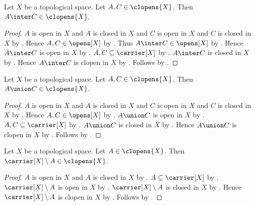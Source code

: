 \begin{proposition}\label{clopens_inter}
    Let $X$ be a topological space.
    Let $A,C\in\clopens{X}$.
    Then $A\inter C\in\clopens{X}$.
\end{proposition}
\begin{proof}
    $A$ is open in $X$ and $A$ is closed in $X$ and
        $C$ is open in $X$ and $C$ is closed in $X$ by
        .
    Hence $A,C\in\opens[X]$ by .
    Thus $A\inter C\in\opens[X]$ by .
    Hence $A\inter C$ is open in $X$ by .
    $A,C\subseteq\carrier[X]$ by
        .
    $A\inter C$ is closed in $X$ by
        .
    Hence $A\inter C$ is clopen in $X$ by .
    Follows by .
\end{proof}

\begin{proposition}\label{clopens_union}
    Let $X$ be a topological space.
    Let $A,C\in\clopens{X}$.
    Then $A\union C\in\clopens{X}$.
\end{proposition}
\begin{proof}
    $A$ is open in $X$ and $A$ is closed in $X$ and
        $C$ is open in $X$ and $C$ is closed in $X$ by
        .
    Hence $A,C\in\opens[X]$ by .
    $A\union C$ is open in $X$ by .
    $A,C\subseteq\carrier[X]$ by
        .
    $A\union C$ is closed in $X$ by
        .
    Hence $A\union C$ is clopen in $X$ by .
    Follows by .
\end{proof}

\begin{proposition}\label{clopens_complement}
    Let $X$ be a topological space.
    Let $A\in\clopens{X}$.
    Then $\carrier[X]\setminus A\in\clopens{X}$.
\end{proposition}
\begin{proof}
    $A$ is open in $X$ and $A$ is closed in $X$ by
        .
    $A\subseteq\carrier[X]$ by .
    $\carrier[X]\setminus A$ is open in $X$ by
        .
    $\carrier[X]\setminus A$ is closed in $X$ by
        .
    Hence $\carrier[X]\setminus A$ is clopen in $X$ by
        .
    Follows by .
\end{proof}

